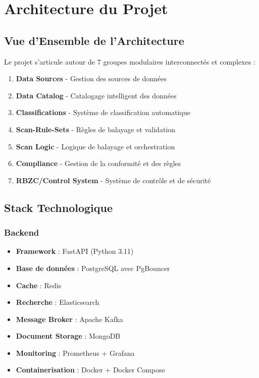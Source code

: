 \documentclass[12pt,a4paper]{article}
\begin{document}
\section{Architecture du Projet}

\subsection{Vue d'Ensemble de l'Architecture}

Le projet s'articule autour de 7 groupes modulaires interconnectés et complexes :

\begin{enumerate}
    \item \textbf{Data Sources} - Gestion des sources de données
    \item \textbf{Data Catalog} - Catalogage intelligent des données
    \item \textbf{Classifications} - Système de classification automatique
    \item \textbf{Scan-Rule-Sets} - Règles de balayage et validation
    \item \textbf{Scan Logic} - Logique de balayage et orchestration
    \item \textbf{Compliance} - Gestion de la conformité et des règles
    \item \textbf{RBZC/Control System} - Système de contrôle et de sécurité
\end{enumerate}

\subsection{Stack Technologique}

\subsubsection{Backend}
\begin{itemize}
    \item \textbf{Framework} : FastAPI (Python 3.11)
    \item \textbf{Base de données} : PostgreSQL avec PgBouncer
    \item \textbf{Cache} : Redis
    \item \textbf{Recherche} : Elasticsearch
    \item \textbf{Message Broker} : Apache Kafka
    \item \textbf{Document Storage} : MongoDB
    \item \textbf{Monitoring} : Prometheus + Grafana
    \item \textbf{Containerisation} : Docker + Docker Compose
\end{itemize}
\end{document}
